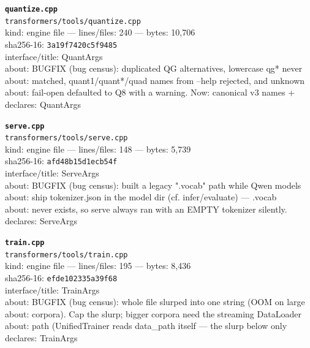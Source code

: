 \noindent\textbf{\texttt{quantize.cpp}}\\
\texttt{transformers/tools/quantize.cpp}\\
kind: engine file --- lines/files: 240 --- bytes: 10,706\\
sha256-16: \texttt{3a19f7420c5f9485}\\
interface/title: QuantArgs\\
about: BUGFIX (bug census): duplicated QG alternatives, lowercase qg* never\\
about: matched, quant1/quant*/quad names from --help rejected, and unknown\\
about: fail-open defaulted to Q8 with a warning. Now: canonical v3 names +\\
declares: QuantArgs\\
\vspace*{6.0pt}
\newpage

\noindent\textbf{\texttt{serve.cpp}}\\
\texttt{transformers/tools/serve.cpp}\\
kind: engine file --- lines/files: 148 --- bytes: 5,739\\
sha256-16: \texttt{afd48b15d1ecb54f}\\
interface/title: ServeArgs\\
about: BUGFIX (bug census): built a legacy ".vocab" path while Qwen models\\
about: ship tokenizer.json in the model dir (cf. infer/evaluate) — .vocab\\
about: never exists, so serve always ran with an EMPTY tokenizer silently.\\
declares: ServeArgs\\
\vspace*{6.0pt}

\noindent\textbf{\texttt{train.cpp}}\\
\texttt{transformers/tools/train.cpp}\\
kind: engine file --- lines/files: 195 --- bytes: 8,436\\
sha256-16: \texttt{efde102335a39f68}\\
interface/title: TrainArgs\\
about: BUGFIX (bug census): whole file slurped into one string (OOM on large\\
about: corpora). Cap the slurp; bigger corpora need the streaming DataLoader\\
about: path (UnifiedTrainer reads data\_path itself — the slurp below only\\
declares: TrainArgs\\
\vspace*{6.0pt}

